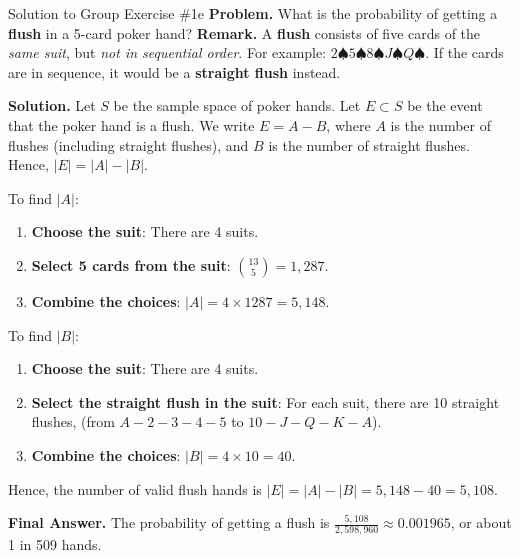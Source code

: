 \documentclass[10pt]{beamer}
\begin{document}
\begin{frame}{Solution to Group Exercise \#1e}
\footnotesize 
 \colorbox{blue!30}{\textbf{Problem.}} What is the probability of getting a \textbf{flush} in a 5-card poker hand?
\vfill 
 \colorbox{red!30}{\textbf{Remark.}} A \textbf{flush} consists of five cards of the \textit{same suit}, but \textit{not in sequential order}. For example: $2\spadesuit 5\spadesuit 8\spadesuit J\spadesuit Q\spadesuit$.  If the cards are in sequence, it would be a \textbf{straight flush} instead.  
 
\vfill 

 \colorbox{green!30}{\textbf{Solution.}} Let $S$ be the sample space of poker hands.  
Let $E \subset S$ be the event that the poker hand is a flush.  We write $E=A-B$, where $A$ is the number of flushes (including straight flushes), and $B$ is the number of straight flushes.  Hence, $|E| = |A|-|B|$. 



\begin{minipage}[t]{0.45\textwidth}
\scriptsize 
To find $|A|$:
\begin{enumerate}
\item \textbf{Choose the suit}: There are 4 suits.  
\item \textbf{Select 5 cards from the suit}: $ \binom{13}{5} = 1,287$.
\item \textbf{Combine the choices}: $|A| = 4 \times 1287 = 5,148$.
\end{enumerate}
\end{minipage} %
\hfill
\begin{minipage}[t]{0.45\textwidth}
\scriptsize 
To find $|B|$:
\begin{enumerate} 
\item \textbf{Choose the suit}: There are 4  suits.  
\item \textbf{Select the straight flush in the suit}: For each suit, there are 10 straight flushes, (from $A-2-3-4-5$ to $10-J-Q-K-A$).
\item \textbf{Combine the choices}: $|B| = 4 \times 10 = 40$.
\end{enumerate}
\end{minipage}

\footnotesize
Hence, the number of valid flush hands is  $ |E| = |A|-|B| = 5,148 - 40 = 5,108$.

\vspace{-.1cm}
\alert{\textbf{Final Answer.}} The probability of getting a flush is $\frac{5,108}{2,598,960} \approx 0.001965$, or about 1 in 509 hands.
\end{frame}
\end{document}
